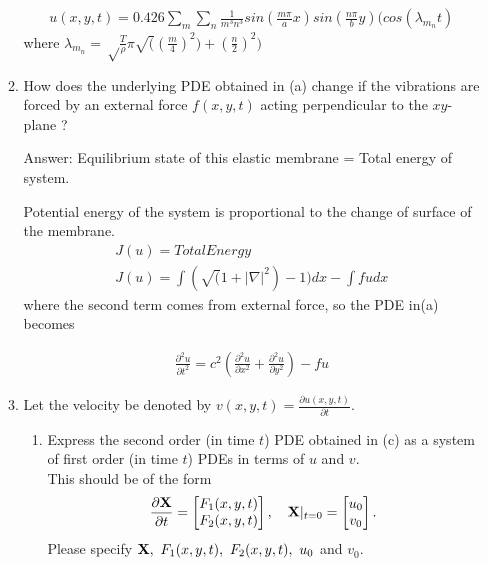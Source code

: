 \documentclass[12pt]{article}
\begin{document}
\begin{enumerate}[{\bf I.}]
\begin{enumerate}
 \begin{align}
 u(x,y,t) = 0.426 \sum_m \sum_n \frac{1}{m^3n^3}sin(\frac{m\pi}{a}x) sin(\frac{n\pi}{b}y)(cos(\lambda_m_nt)
 \end{align}
 where $\lambda_m_n = \sqrt\frac{T}{\rho}\pi\sqrt((\frac{m}{4})^2) +(\frac{n}{2})^2) $




\item  How does the underlying PDE obtained in (a) change if the vibrations are forced by an external force $f(x,y,t)$ acting perpendicular to the $xy$-plane ?




 Answer:
 Equilibrium state of this elastic membrane = Total energy of system.
 
 Potential energy of the system is proportional to the change of surface of the membrane.
 \begin{align}
       J(u) = Total Energy
       \\J(u) = \int(\sqrt(1+|\nabla|^2) -1)dx - \int fudx
 \end{align}
 where the second term comes from external force, so the PDE in(a) becomes
 
 \begin{align}
 \frac{\partial^2 u}{\partial t^2} = c^2 (\frac{\partial^2 u}{\partial x^2} + \frac{\partial^2 u}{\partial y^2}) -fu
 \end{align}





\item Let the velocity be denoted by $v(x,y,t)=\frac{\partial u(x,y,t)}{\partial t}$.  
\begin{enumerate}
\item Express the second order (in time $t$) PDE obtained in (c) as a system of first order (in time $t$) PDEs in terms of $u$ and $v$. \\
This should be of the form 
\begin{align}
\label{time_firstorder}
\frac{\partial \bf X}{\partial t} = \begin{bmatrix}
F_1(x,y,t)\\
F_2(x,y,t)
\end{bmatrix},
\quad {\bf X}|_{t=0}=\begin{bmatrix}
u_0\\
v_0
\end{bmatrix}.
\end{align}
Please specify ${\bf X}, \ F_1(x,y,t), \ F_2(x,y,t), \  u_0$ and $v_0$.



\end{enumerate}
\end{enumerate}
\end{enumerate}
\end{document}
